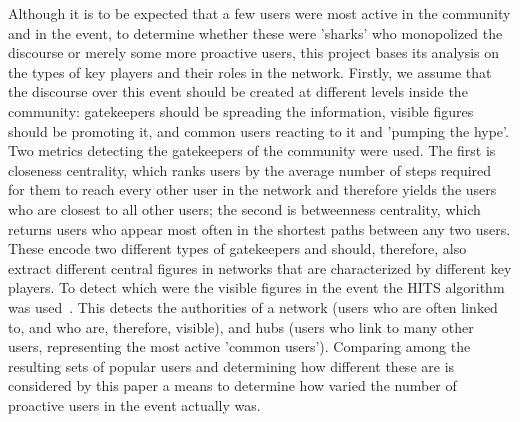 \documentclass[noacm,sigconf,authorversion]{acmart}
\begin{document}
Although it is to be expected that a few users were most active in the community and in the event, to determine whether these were 'sharks' who monopolized the discourse or merely some more proactive users, this project bases its analysis on the types of key players and their roles in the network. Firstly, we assume that the discourse over this event should be created at different levels inside the community: gatekeepers should be spreading the information, visible figures should be promoting it, and common users reacting to it and 'pumping the hype'. Two metrics detecting the gatekeepers of the community were used. The first is closeness centrality, which ranks users by the average number of steps required for them to reach every other user in the network and therefore yields the users who are closest to all other users; the second is betweenness centrality, which returns users who appear most often in the shortest paths between any two users. These encode two different types of gatekeepers and should, therefore, also extract different central figures in networks that are characterized by different key players. To detect which were the visible figures in the event the HITS algorithm was used~\cite{kleinberg1999hubs}. This detects the authorities of a network (users who are often linked to, and who are, therefore, visible), and hubs (users who link to many other users, representing the most active 'common users'). Comparing among the resulting sets of popular users and determining how different these are is considered by this paper a means to determine how varied the number of proactive users in the event actually was.
\end{document}
